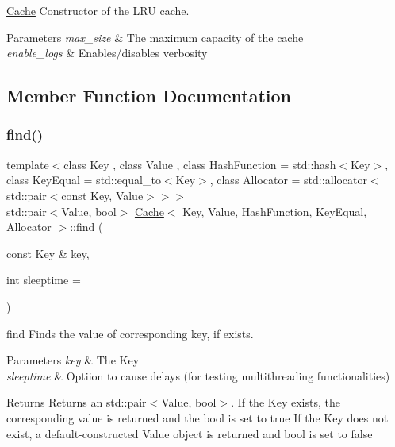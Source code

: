 \mbox{\hyperlink{class_cache}{Cache}} Constructor of the L\+RU cache. 


\begin{DoxyParams}{Parameters}
{\em max\+\_\+size} & The maximum capacity of the cache \\
\hline
{\em enable\+\_\+logs} & Enables/disables verbosity \\
\hline
\end{DoxyParams}


\subsection{Member Function Documentation}
\mbox{\label{class_cache_a69e99d60b40223afce1b5c1a89a71e05}} 
\subsubsection{\texorpdfstring{find()}{find()}}
{\footnotesize\ttfamily template$<$class Key , class Value , class Hash\+Function  = std\+::hash$<$\+Key$>$, class Key\+Equal  = std\+::equal\+\_\+to$<$\+Key$>$, class Allocator  = std\+::allocator$<$std\+::pair$<$const Key, Value$>$$>$$>$ \\
std\+::pair$<$Value, bool$>$ \mbox{\hyperlink{class_cache}{Cache}}$<$ Key, Value, Hash\+Function, Key\+Equal, Allocator $>$\+::find (\begin{DoxyParamCaption}\item[{const Key \&}]{key,  }\item[{int}]{sleeptime = {} }\end{DoxyParamCaption})\hspace{0.3cm}{\ttfamily [inline]}}



find Finds the value of corresponding key, if exists. 


\begin{DoxyParams}{Parameters}
{\em key} & The Key \\
\hline
{\em sleeptime} & Optiion to cause delays (for testing multithreading functionalities) \\
\hline
\end{DoxyParams}
\begin{DoxyReturn}{Returns}
Returns an std\+::pair$<$\+Value, bool$>$. If the Key exists, the corresponding value is returned and the bool is set to true If the Key does not exist, a default-\/constructed Value object is returned and bool is set to false 
\end{DoxyReturn}
\mbox{\label{class_cache_a8e44a1490dac6dfdaa5dd75dc558b1c2}} 
